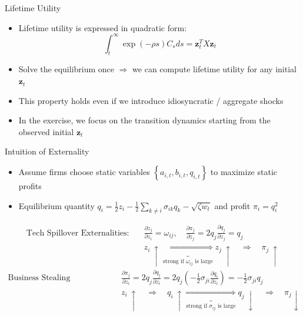 \documentclass[
  10pt,
  aspectratio=169,   %
]{beamer}
\theoremstyle{plain}
\begin{document}
\begin{frame}{Lifetime Utility}

  \label{aggregation}
  \begin{itemize}
    \item Lifetime utility is expressed in quadratic form:
          \[
            \int_{t}^{\infty}\exp\left(-\rho s\right)C_{s}ds=\bm{z}_{t}^{T}X\bm{z}_{t}
          \]

          \hyperlink{X}{}
    \item Solve the equilibrium once $\Longrightarrow$ we can compute lifetime utility for any initial $\bm{z}_{t}$
          \medskip{}
    \item This property holds even if we introduce idiosyncratic / aggregate shocks
          \medskip{}
    \item In the exercise, we focus on the transition dynamics starting from the observed initial $\bm{z}_{t}$
  \end{itemize}
\end{frame}

\begin{frame}{Intuition of Externality}
  \label{static_equilibrium}
  \begin{itemize}
    \item Assume firms choose static variables $\left\{a_{i,t}, b_{i,t}, q_{i,t}\right\}$ to maximize static profits \pause
    \item Equilibrium quantity $q_i = \frac{1}{2} z_i - \frac{1}{2}\sum_{k \neq i} \sigma_{ik} q_k - \sqrt{\zeta w_t}$ and profit $\pi_i = q_i^2$ \pause
  \end{itemize}
  \begin{align*}
    \text{Tech Spillover Externalities:} \quad &
    \frac{\partial \dot{z}_j}{\partial z_i} = \omega_{ij}, \quad
    \frac{\partial \pi_j}{\partial z_j} = 2 q_j \frac{\partial q_j}{\partial z_j} = q_j \\
    & z_i \ \uparrow \underbrace{\Longrightarrow}_{\text{strong if } \omega_{ij} \text{ is large}}   z_j \ \uparrow \quad \Longrightarrow \quad \pi_j \ \uparrow
  \end{align*}\pause
  \begin{align*}
    \text{Business Stealing Externalities:} \quad &
    \frac{\partial \pi_j}{\partial z_i} = 2 q_j \frac{\partial q_j}{\partial z_i}
    = 2 q_j \left(-\frac{1}{2}\sigma_{ji}\frac{\partial q_i}{\partial z_i}\right)
    = -\frac{1}{2}\sigma_{ji} q_j \\
    & z_i \ \uparrow \quad \Longrightarrow \quad q_i \ \uparrow \underbrace{\Longrightarrow}_{\text{strong if } \sigma_{ij} \text{ is large}} q_j \ \downarrow \quad \Longrightarrow \quad \pi_j  \downarrow
  \end{align*}
\end{frame}
\end{document}
